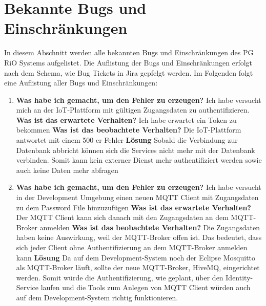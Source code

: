 \section{Bekannte Bugs und Einschränkungen}
\label{sec:bugsundeinschraenkungen}
In diesem Abschnitt werden alle bekannten Bugs und Einschränkungen des PG RiO Systems aufgelistet. Die Auflistung der Bugs und Einschränkungen erfolgt nach dem Schema, wie Bug Tickets in Jira gepfelgt werden. Im Folgenden folgt eine Auflistung aller Bugs und Einschränkungen:

\begin{enumerate}
	\item \textbf{Was habe ich gemacht, um den Fehler zu erzeugen?} \newline
	Ich habe versucht mich an der IoT-Plattform mit gültigen Zugangsdaten zu authentifizieren. \newline
	\textbf{Was ist das erwartete Verhalten?}\newline
	Ich habe erwartet ein Token zu bekommen \newline
	\textbf{Was ist das beobachtete Verhalten?} \newline
	Die IoT-Plattform antwortet mit einem 500 er Fehler \newline
	\textbf{Lösung} \newline
	Sobald die Verbindung zur Datenbank abbricht können sich die Services nicht mehr mit der Datenbank verbinden. Somit kann kein externer Dienst mehr authentifiziert werden sowie auch keine Daten mehr abfragen
	\item \textbf{Was habe ich gemacht, um den Fehler zu erzeugen?} \newline
	Ich habe versucht in der Development Umgebung einen neuen MQTT Client mit Zugangsdaten zu dem Password File hinzuzufügen \newline
	\textbf{Was ist das erwartete Verhalten?}\newline
	Der MQTT Client kann sich danach mit den Zugangsdaten an dem MQTT-Broker anmelden \newline
	\textbf{Was ist das beobachtete Verhalten?} \newline
	Die Zugangsdaten haben keine Auswirkung, weil der MQTT-Broker offen ist. Das bedeutet, dass sich jeder Client ohne Authentifizierung an dem MQTT-Broker anmelden kann \newline
	\textbf{Lösung} \newline
	Da auf dem Development-System noch der Eclipse Mosquitto als MQTT-Broker läuft, sollte der neue MQTT-Broker, HiveMQ, eingerichtet werden. Somit würde die Authentifizierung, wie geplant, über den Identity-Service laufen und die Tools zum Anlegen von MQTT Client würden auch auf dem Development-System richtig funktionieren.

\end{enumerate}

